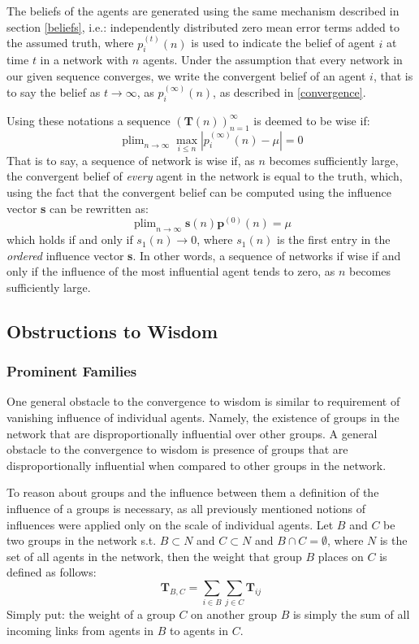 \documentclass{article}
\DeclareMathOperator*{\plim}{plim}
\newcommand{\T}{\textbf{T}}
\newcommand{\Tij}{\textbf{T}_{ij}}
\newcommand{\Soc}{(\T(n))^{\infty}_{n=1}}
\newcommand{\beli}[3][2]{p_{#2}^{(#3)}}
\begin{document}
The beliefs of the agents are generated using the same mechanism described in section \ref{beliefs}, i.e.: independently distributed zero mean error terms added to the assumed truth, where $\beli{i}{t}(n)$ is used to indicate the belief of agent $i$ at time $t$ in a network with $n$ agents. Under the assumption that every network in our given sequence converges, we write the convergent belief of an agent $i$, that is to say the belief as $t \to\infty$, as $\beli{i}{\infty}(n)$, as described in \ref{convergence}.

Using these notations a sequence $\Soc$ is deemed to be wise if:
\begin{equation}
    \label{wisdom:equation}
    \plim_{n\to\infty}\max_{i \leq n}|\beli{i}{\infty}(n) - \mu| = 0
\end{equation}
That is to say, a sequence of network is wise if, as $n$ becomes sufficiently large, the convergent belief of \emph{every} agent in the network is equal to the truth, which, using the fact that the convergent belief can be computed using the influence vector \textbf{s} can be rewritten as:
\begin{equation}
    \label{wisdom:influence}
    \plim_{n\to\infty} \textbf{s}(n)\textbf{p}^{(0)}(n) = \mu
\end{equation}
which holds if and only if $s_{1}(n) \to 0$, where $s_1(n)$ is the first entry in the \emph{ordered} influence vector \textbf{s}. In other words, a sequence of networks if wise if and only if the influence of the most influential agent tends to zero, as $n$ becomes sufficiently large.

\newpage

\subsection{Obstructions to Wisdom}

\subsubsection{Prominent Families}

One general obstacle to the convergence to wisdom is similar to requirement of vanishing influence of individual agents. Namely, the existence of groups in the network that are disproportionally influential over other groups.
A general obstacle to the convergence to wisdom is presence of groups that are disproportionally influential when compared to other groups in the network.

To reason about groups and the influence between them a definition of the influence of a groups is necessary, as all previously mentioned notions of influences were applied only on the scale of individual agents. Let $B$ and $C$ be two groups in the network s.t. $B \subset N$ and $C \subset N$ and $B \cap C = \emptyset$, where $N$ is the set of all agents in the network, then the weight that group $B$ places on $C$ is defined as follows:
\begin{equation}
    \textbf{T}_{B, C} = \sum_{i\in B}\sum_{j \in C} \Tij
\end{equation}
Simply put: the weight of a group $C$ on another group $B$ is simply the sum of all incoming links from agents in $B$ to agents in $C$.
\end{document}
